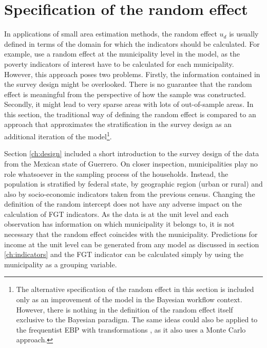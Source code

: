 \section{Specification of the random effect}
\label{ch:raneff}
In applications of small area estimation methods, the random effect $u_d$ is usually defined in terms of the domain for which the indicators should be calculated.
For example, \cite{rojas_perilla_data_2020} use a random effect at the municipality level in the model, as the poverty indicators of interest have to be calculated for each municipality.
However, this approach poses two problems.
Firstly, the information contained in the survey design might be overlooked.
There is no guarantee that the random effect is meaningful from the perspective of how the sample was constructed.
Secondly, it might lead to very sparse areas with lots of out-of-sample areas.
In this section, the traditional way of defining the random effect is compared to an approach that approximates the stratification in the survey design as an additional iteration of the model\footnote{The alternative specification of the random effect in this section is included only as an improvement of the model in the Bayesian workflow context. However, there is nothing in the definition of the random effect itself exclusive to  the Bayesian paradigm. The same ideas could also be applied to the frequentist EBP with transformations \citep{rojas_perilla_data_2020}, as it also uses a Monte Carlo approach.}.

Section \ref{ch:design} included a short introduction to the survey design of the data from the Mexican state of Guerrero.
On closer inspection, municipalities play no role whatsoever in the sampling process of the households.
Instead, the population is stratified by federal state, by geographic region (urban or rural) and also by socio-economic indicators taken from the previous census.
Changing the definition of the random intercept does not have any adverse impact on the calculation of FGT indicators.
As the data is at the unit level and each observation has information on which municipality it belongs to, it is not necessary that the random effect coincides with the municipality.
Predictions for income at the unit level can be generated from any model as discussed in section \ref{ch:indicators} and the FGT indicator can be calculated simply by using the municipality as a grouping variable.


